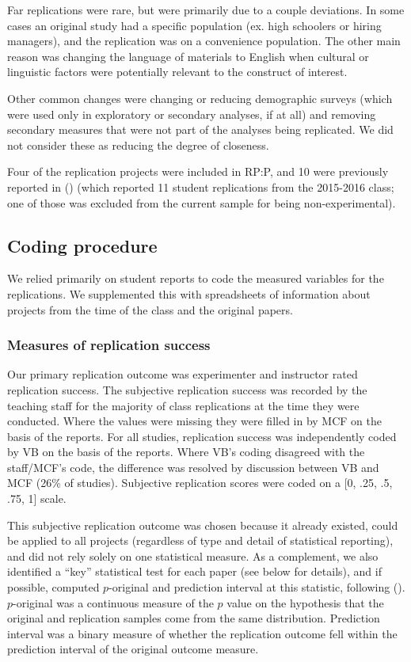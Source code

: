 \documentclass[
  english,
  a4paper,
]{article}
\begin{document}
Far replications were rare, but were primarily due to a couple deviations. In some cases an original study had a specific population (ex. high schoolers or hiring managers), and the replication was on a convenience population. The other main reason was changing the language of materials to English when cultural or linguistic factors were potentially relevant to the construct of interest.

Other common changes were changing or reducing demographic surveys (which were used only in exploratory or secondary analyses, if at all) and removing secondary measures that were not part of the analyses being replicated. We did not consider these as reducing the degree of closeness.

Four of the replication projects were included in RP:P, and 10 were previously reported in () (which reported 11 student replications from the 2015-2016 class; one of those was excluded from the current sample for being non-experimental).

\subsection{Coding procedure}\label{coding-procedure}

We relied primarily on student reports to code the measured variables for the replications. We supplemented this with spreadsheets of information about projects from the time of the class and the original papers.

\subsubsection{Measures of replication success}\label{measures-of-replication-success}

Our primary replication outcome was experimenter and instructor rated replication success. The subjective replication success was recorded by the teaching staff for the majority of class replications at the time they were conducted. Where the values were missing they were filled in by MCF on the basis of the reports. For all studies, replication success was independently coded by VB on the basis of the reports. Where VB's coding disagreed with the staff/MCF's code, the difference was resolved by discussion between VB and MCF (26\% of studies). Subjective replication scores were coded on a {[}0, .25, .5, .75, 1{]} scale.

This subjective replication outcome was chosen because it already existed, could be applied to all projects (regardless of type and detail of statistical reporting), and did not rely solely on one statistical measure. As a complement, we also identified a ``key'' statistical test for each paper (see below for details), and if possible, computed \(p\)-original and prediction interval at this statistic, following (). \(p\)-original was a continuous measure of the \(p\) value on the hypothesis that the original and replication samples come from the same distribution. Prediction interval was a binary measure of whether the replication outcome fell within the prediction interval of the original outcome measure.
\end{document}
